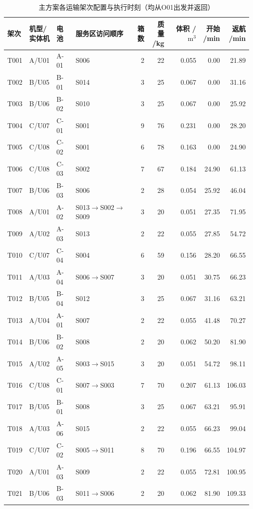 \begin{table}[!htbp]
\centering
\footnotesize
\setlength{\tabcolsep}{3pt}
\renewcommand{\arraystretch}{1.10}
\caption{主方案各运输架次配置与执行时刻（均从O01出发并返回）}\label{tab:q3-sorties}
\begin{tabular}{@{}lll lrrrrr@{}}
\toprule
架次 & \shortstack{机型/\\实体机} & 电池 & 服务区访问顺序 & 箱数 & \shortstack{质量\\/kg} & \shortstack{体积\\/$\mathrm{m^3}$} & \shortstack{开始\\/min} & \shortstack{返航\\/min} \\
\midrule
T001 & A/U01 & A-01 & S006 & 2 & 22 & 0.055 & 0.00 & 21.89 \\
T002 & B/U05 & B-01 & S014 & 3 & 25 & 0.067 & 0.00 & 31.16 \\
T003 & B/U06 & B-02 & S010 & 3 & 25 & 0.067 & 0.00 & 25.92 \\
T004 & C/U07 & C-01 & S001 & 9 & 76 & 0.231 & 0.00 & 28.20 \\
T005 & C/U08 & C-02 & S001 & 6 & 78 & 0.163 & 0.00 & 24.90 \\
T006 & C/U08 & C-03 & S002 & 7 & 67 & 0.184 & 24.90 & 61.13 \\
T007 & B/U06 & B-03 & S006 & 2 & 28 & 0.054 & 25.92 & 46.04 \\
T008 & A/U01 & A-02 & S013$\to$S002$\to$S009 & 3 & 20 & 0.051 & 27.35 & 71.95 \\
T009 & A/U02 & A-03 & S013 & 2 & 22 & 0.055 & 27.85 & 54.72 \\
T010 & C/U07 & C-04 & S004 & 6 & 59 & 0.156 & 28.20 & 66.55 \\
T011 & A/U03 & A-04 & S006$\to$S007 & 3 & 20 & 0.051 & 30.75 & 66.23 \\
T012 & B/U05 & B-04 & S012 & 3 & 25 & 0.067 & 31.16 & 63.21 \\
T013 & A/U04 & A-01 & S007 & 2 & 22 & 0.055 & 41.48 & 70.27 \\
T014 & B/U06 & B-02 & S008 & 2 & 20 & 0.062 & 50.20 & 81.90 \\
T015 & A/U02 & A-05 & S003$\to$S015 & 3 & 20 & 0.051 & 54.72 & 98.11 \\
T016 & C/U08 & C-01 & S007$\to$S003 & 7 & 70 & 0.207 & 61.13 & 106.03 \\
T017 & B/U05 & B-01 & S008 & 3 & 25 & 0.067 & 63.21 & 95.91 \\
T018 & A/U03 & A-06 & S015 & 2 & 22 & 0.055 & 66.23 & 99.04 \\
T019 & C/U07 & C-02 & S005$\to$S011 & 8 & 70 & 0.196 & 66.55 & 104.97 \\
T020 & A/U01 & A-03 & S009 & 2 & 22 & 0.055 & 72.81 & 100.95 \\
T021 & B/U06 & B-03 & S011$\to$S006 & 2 & 20 & 0.062 & 81.90 & 109.33 \\
\bottomrule
\end{tabular}
\end{table}
